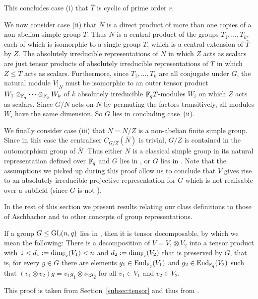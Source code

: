This concludes case (i) that $\bar T$ is cyclic of prime order $r$.

We now consider case (ii) that $\bar N$ is a direct product of more than
one copies of a non-abelian simple group $\bar T$. Thus $N$ is a
central product of the groups $T_1, \ldots, T_k$, each of which is
isomorphic to a single group $T$, which is a central extension of
$\bar T$ by $Z$. The absolutely irreducible representations
of $N$ in which $Z$ acts as scalars are just tensor products of 
absolutely irreducible representations of $T$ in which $Z \le T$ acts as
scalars. Furthermore, since $T_1, \ldots, T_k$ are all conjugate under
$G$, the natural module $V|_N$ must be isomorphic to an outer tensor product
$W_1 \otimes_{\mathbb{F}_q} \cdots \otimes_{\mathbb{F}_q} W_k$ 
of $k$ absolutely irreducible $\mathbb{F}_q T$-modules $W_i$ on which $Z$
acts as scalars. Since $G/N$ acts on $N$ by permuting the factors
transitively, all modules $W_i$ have the same dimension. So $G$ lies in
 concluding case~(ii).

We finally consider case (iii) that $\bar N = N/Z$ is a non-abelian finite 
simple group. Since in this case the centraliser $C_{G/Z}(\bar N)$ is 
trivial, $G/Z$ is contained in the automorphism group of $\bar N$. 
Thus either $N$ is a classical simple group in its natural
representation defined over $\mathbb{F}_q$ and
$G$ lies in , or $G$ lies in . Note that the assumptions we
picked up during this proof allow us to conclude that $V$
gives rise to an absolutely irreducible projective representation for
$G$ which is not realisable over a subfield (since $G$ is not ).
\proofend

\medskip
In the rest of this section we present results relating our class
definitions to those of Aschbacher and to other concepts of group
representations.

\begin{Prop}
    \label{tensorprop}
If a group $G \le \GL(n,q)$ lies in , then it is tensor decomposable,
by which we mean the following:
There is a decomposition
of\/ $V = V_1 \otimes V_2$ into a tensor product with 
$1 < d_1 := \dim_{\mathbb{F}_q}(V_1) < n$
and $d_2 := \dim_{\mathbb{F}_q}(V_2)$ that is preserved by $G$, 
that is, for every $g \in
G$ there are elements $g_1 \in \End_{\F_q}(V_1)$ and $g_2 \in
\End_{\F_q}(V_2)$ such that $(v_1 \otimes v_2) g = v_1 g_1 \otimes v_2 g_2$
for all $v_1 \in V_1$ and $v_2 \in V_2$.
\end{Prop}
\proofbeg
This proof is taken from Section~\ref{subsec:tensor} and thus from 
\cite[Section~6.6]{subfieldpaper}.

